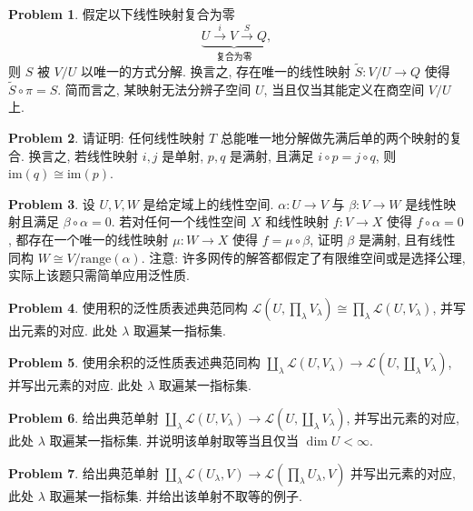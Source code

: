 \documentclass{MainStyle}
\theoremstyle{definition}
\newtheorem{problem}{Problem}
\begin{document}
\begin{problem}
假定以下线性映射复合为零
\begin{equation}
    \underset{\text{复合为零}}{\underbrace{U\overset i\longrightarrow V\overset S\longrightarrow Q}},
\end{equation}
则 $S$ 被 $V/U$ 以唯一的方式分解. 换言之, 存在唯一的线性映射 $\widetilde S:V/U\to Q$ 使得 $\widetilde S\circ \pi=S$. 简而言之, 某映射无法分辨子空间 $U$, 当且仅当其能定义在商空间 $V/U$ 上.
\end{problem}

\begin{problem}
请证明: 任何线性映射 $T$ 总能唯一地分解做先满后单的两个映射的复合. 换言之, 若线性映射 $i,j$ 是单射, $p,q$ 是满射, 且满足 $i\circ p=j\circ q$, 则 $\mathrm{im}(q)\cong \mathrm{im}(p)$.
\end{problem}

\begin{problem}
设 $U,V,W$ 是给定域上的线性空间. $\alpha:U\to V$ 与 $\beta:V\to W$ 是线性映射且满足 $\beta\circ \alpha=0$. 若对任何一个线性空间 $X$ 和线性映射 $f:V\to X$ 使得 $f\circ \alpha=0$, 都存在一个唯一的线性映射 $\mu:W\to X$ 使得 $f=\mu \circ \beta$, 证明 $\beta$ 是满射, 且有线性同构 $W\cong V/\mathrm{range}(\alpha)$. 注意: 许多网传的解答都假定了有限维空间或是选择公理, 实际上该题只需简单应用泛性质.
\end{problem}

\begin{problem}
使用积的泛性质表述典范同构 $\mathcal L(U,\prod_\lambda V_\lambda)\cong \prod_\lambda\mathcal L(U, V_\lambda)$, 并写出元素的对应. 此处 $\lambda$ 取遍某一指标集.
\end{problem}

\begin{problem}
使用余积的泛性质表述典范同构 $\coprod_{\lambda}\mathcal L (U,V_\lambda)\to \mathcal L (U,\coprod_\lambda V_\lambda )$, 并写出元素的对应. 此处 $\lambda$ 取遍某一指标集.
\end{problem}

\begin{problem}
给出典范单射 $\coprod_{\lambda}\mathcal L (U,V_\lambda)\to \mathcal L (U,\coprod_\lambda V_\lambda)$, 并写出元素的对应, 此处 $\lambda$ 取遍某一指标集. 并说明该单射取等当且仅当 $\dim U<\infty$.
\end{problem}

\begin{problem}
给出典范单射 $\coprod_{\lambda}\mathcal L (U_\lambda ,V)\to \mathcal L (\prod _{\lambda }U_\lambda ,V)$ 并写出元素的对应, 此处 $\lambda$ 取遍某一指标集. 并给出该单射不取等的例子.
\end{problem}
\end{document}
